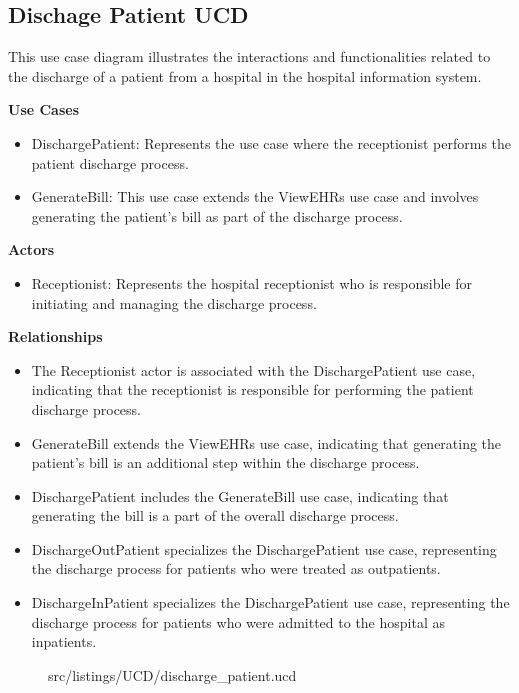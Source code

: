\subsection{Dischage Patient UCD}

This use case diagram illustrates the interactions and functionalities related to the discharge of a patient from a hospital in the hospital information system.

\textbf{Use Cases}
\begin{itemize}
    \item DischargePatient: Represents the use case where the receptionist performs the patient discharge process.
    \item GenerateBill: This use case extends the ViewEHRs use case and involves generating the patient's bill as part of the discharge process.
\end{itemize}

\textbf{Actors}
\begin{itemize}
    \item Receptionist: Represents the hospital receptionist who is responsible for initiating and managing the discharge process.
\end{itemize}

\textbf{Relationships}
\begin{itemize}
    \item The Receptionist actor is associated with the DischargePatient use case, indicating that the receptionist is responsible for performing the patient discharge process.
    \item GenerateBill extends the ViewEHRs use case, indicating that generating the patient's bill is an additional step within the discharge process.
    \item DischargePatient includes the GenerateBill use case, indicating that generating the bill is a part of the overall discharge process.
    \item DischargeOutPatient specializes the DischargePatient use case, representing the discharge process for patients who were treated as outpatients.
    \item DischargeInPatient specializes the DischargePatient use case, representing the discharge process for patients who were admitted to the hospital as inpatients.
\end{itemize}


\begin{figure}[!htb]
\lstset{language=MontiArc}
 {src/listings/UCD/discharge_patient.ucd}
\end{figure}




